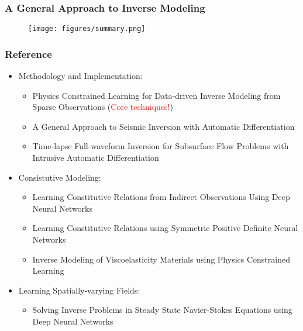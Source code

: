 \documentclass[usenames,dvipsnames]{beamer}
\begin{document}
\begin{frame}
	\frametitle{A General Approach to Inverse Modeling}
	\begin{figure}[hbt]
		\texttt{[image: figures/summary.png]}
	\end{figure}
\end{frame}

\begin{frame}
	\frametitle{Reference}

\begin{itemize}
	\item Methodology and Implementation:
	
	\begin{itemize}
			\item Physics Constrained Learning for Data-driven Inverse Modeling from Sparse Observations (\textcolor{red}{Core techniques!})
			\item A General Approach to Seismic Inversion with Automatic Differentiation
			\item Time-lapse Full-waveform Inversion for Subsurface Flow Problems with Intrusive Automatic Differentiation
	\end{itemize}

	
	\item Consistutive Modeling:
	\begin{itemize}
		\item Learning Constitutive Relations from Indirect Observations Using Deep Neural Networks
		\item Learning Constitutive Relations using Symmetric Positive Definite Neural Networks
		\item Inverse Modeling of Viscoelasticity Materials using Physics Constrained Learning
	\end{itemize}
	
	\item Learning Spatially-varying Fields:
	\begin{itemize}
		\item Solving Inverse Problems in Steady State Navier-Stokes Equations using Deep Neural Networks
	\end{itemize}
	
\end{itemize}

\end{frame}



\end{document}

